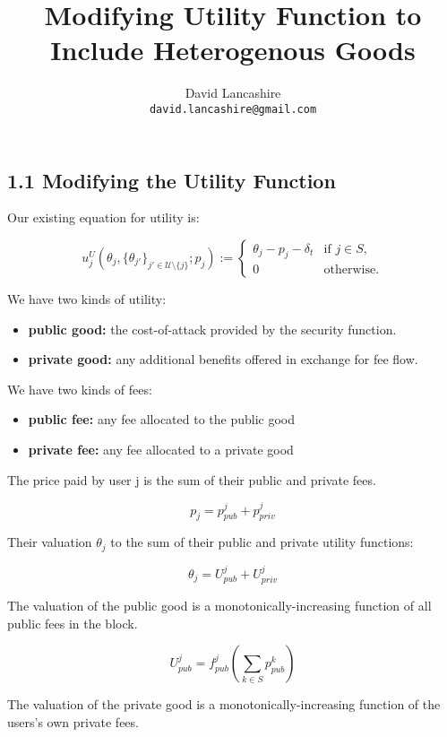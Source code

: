 \documentclass[oneside]{article}   	%
\title{Modifying Utility Function to Include Heterogenous Goods}
\author{
  David Lancashire\\
  \texttt{david.lancashire@gmail.com}\\
}
\begin{document}
\maketitle

\subsection*{1.1 Modifying the Utility Function}
\vspace{0.5em}

Our existing equation for utility is:

\[
u_j^U(\theta_j, \{\theta_{j'}\}_{j' \in \mathcal{U} \setminus \{j\}}; p_j) := 
\begin{cases} 
\theta_j - p_j - \delta_t & \text{if } j \in S, \\
0 & \text{otherwise.}
\end{cases}
\]
\vspace{0.5em}

We have two kinds of utility:

\begin{itemize}
  \item \textbf{public good:} the cost-of-attack provided by the security function.
  \item \textbf{private good:} any additional benefits offered in exchange for fee flow.
\end{itemize}

We have two kinds of fees:

\begin{itemize}
  \item \textbf{public fee:} any fee allocated to the public good
  \item \textbf{private fee:} any fee allocated to a private good
\end{itemize}

The price paid by user j is the sum of their public and private fees.

$$
p_j = p_{pub}^j + p_{priv}^j
$$

Their valuation $\theta_j$ to the sum of their public and private utility functions:

$$
\theta_j = U_{pub}^j + U_{priv}^j
$$

The valuation of the public good is a monotonically-increasing function of all public fees in the block.

$$
U_{pub}^j = f_{pub}^j\left(\sum_{k \in S} p_{pub}^{k}\right)
$$

The valuation of the private good is a monotonically-increasing function of the users's own private fees.
\end{document}
